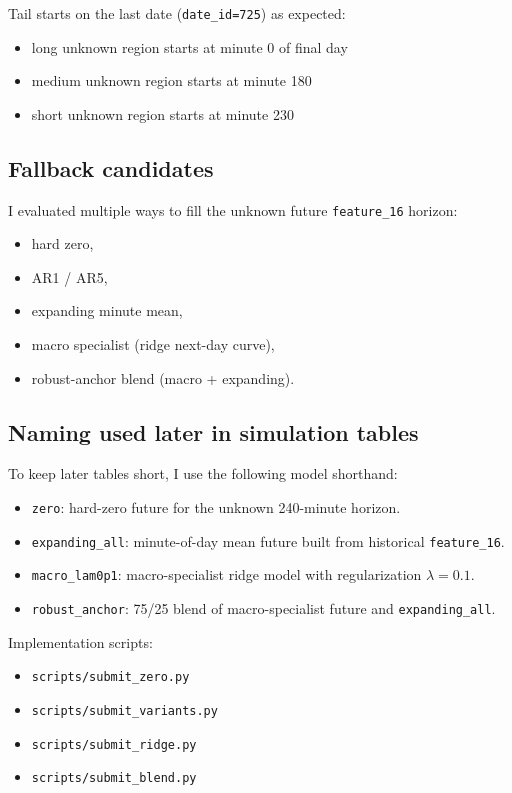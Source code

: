 Tail starts on the last date (\texttt{date\_id=725}) as expected:
\begin{itemize}[leftmargin=1.5em]
  \item long unknown region starts at minute 0 of final day
  \item medium unknown region starts at minute 180
  \item short unknown region starts at minute 230
\end{itemize}

\subsection{Fallback candidates}
I evaluated multiple ways to fill the unknown future \texttt{feature\_16} horizon:
\begin{itemize}[leftmargin=1.5em]
  \item hard zero,
  \item AR1 / AR5,
  \item expanding minute mean,
  \item macro specialist (ridge next-day curve),
  \item robust-anchor blend (macro + expanding).
\end{itemize}

\subsection{Naming used later in simulation tables}
To keep later tables short, I use the following model shorthand:
\begin{itemize}[leftmargin=1.5em]
  \item \texttt{zero}: hard-zero future for the unknown 240-minute horizon.
  \item \texttt{expanding\_all}: minute-of-day mean future built from historical \texttt{feature\_16}.
  \item \texttt{macro\_lam0p1}: macro-specialist ridge model with regularization $\lambda=0.1$.
  \item \texttt{robust\_anchor}: 75/25 blend of macro-specialist future and \texttt{expanding\_all}.
\end{itemize}

Implementation scripts:
\begin{itemize}[leftmargin=1.5em]
  \item \texttt{scripts/submit\_zero.py}
  \item \texttt{scripts/submit\_variants.py}
  \item \texttt{scripts/submit\_ridge.py}
  \item \texttt{scripts/submit\_blend.py}
\end{itemize}

